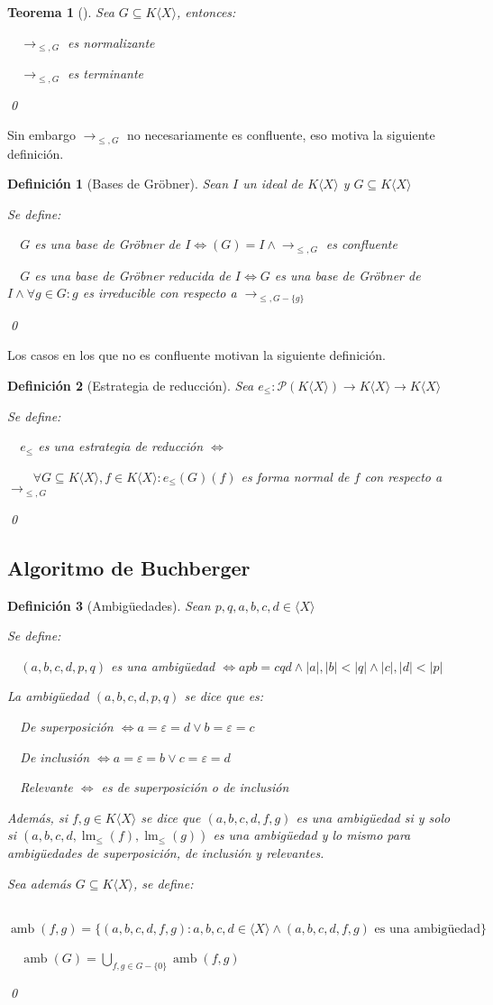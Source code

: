 \documentclass{amsbook}
\theoremstyle{customstyle}
\newtheorem{definition}{Definición}[section]
\newtheorem{theorem}{Teorema}[section]
\newcommand{\definición}[2][]{
  \begin{definition}[#1]
  \setlength{\parindent}{2em} %
  #2
  \qed
  \end{definition}
}
\newcommand{\teorema}[2][]{
  \begin{theorem}[#1]
  \setlength{\parindent}{2em} %
  #2
  \qed
  \end{theorem}
}
\DeclareMathOperator{\lm}{lm}
\DeclareMathOperator{\amb}{amb}
\begin{document}
\teorema[]{
Sea $G ⊆ K⟨X⟩$, entonces:

  $→_{≤, G}$ es normalizante

  $→_{≤, G}$ es terminante

}

Sin embargo $→_{≤, G}$ no necesariamente es confluente, eso motiva la siguiente definición.

\definición[Bases de Gröbner] {
Sean $I$ un ideal de $K⟨X⟩$ y $G ⊆ K⟨X⟩$

Se define:

  $G$ es una base de Gröbner de $I ⇔ (G) = I ∧ →_{≤, G}$ es confluente

  $G$ es una base de Gröbner reducida de $I ⇔ G$ es una base de Gröbner de $I ∧ ∀g ∈ G : g$ es irreducible con respecto a $→_{≤, G - \{g\}}$

}

Los casos en los que no es confluente motivan la siguiente definición.

\definición[Estrategia de reducción] {
Sea $e_≤ : 𝒫(K⟨X⟩) → K⟨X⟩ → K⟨X⟩$

Se define:

  $e_≤$ es una estrategia de reducción $⇔$

    $∀G ⊆ K⟨X⟩, f ∈ K⟨X⟩ : e_≤(G)(f)$ es forma normal de $f$ con respecto a $→_{≤, G}$

}


\subsection{Algoritmo de Buchberger}

\definición[Ambigüedades] {
Sean $p, q, a, b, c, d ∈ ⟨X⟩$

Se define:

  $(a, b, c, d, p, q)$ es una ambigüedad $ ⇔ apb = cqd ∧ |a|, |b| < |q| ∧ |c|, |d| < |p|$

La ambigüedad $(a, b, c, d, p, q)$ se dice que es:

  De superposición $⇔ a = ε = d ∨ b = ε = c$

  De inclusión $⇔ a = ε = b ∨ c = ε = d$

  Relevante $⇔$ es de superposición o de inclusión

Además, si $f, g ∈ K⟨X⟩$ se dice que $(a, b, c, d, f, g)$ es una ambigüedad si y solo si $(a, b, c, d, \lm_≤{(f)}, \lm_≤{(g)})$ es una ambigüedad y lo mismo para ambigüedades de superposición, de inclusión y relevantes.

Sea además $G ⊆ K⟨X⟩$, se define:

  $\amb(f, g) = \{(a, b, c, d, f, g) : a, b, c, d ∈ ⟨X⟩ ∧ (a, b, c, d, f, g)\text{ es una ambigüedad}\}$

  $\amb(G) = \bigcup_{f, g ∈ G - \{0\}}{\amb(f, g)}$

}
\end{document}
